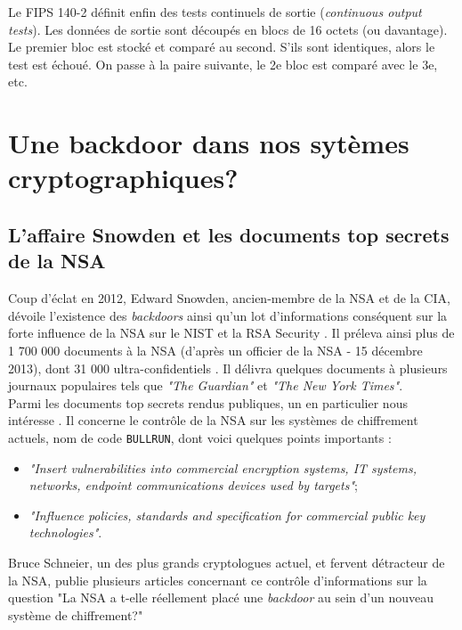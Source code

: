 		
		Le FIPS 140-2 définit enfin des tests continuels de sortie (\textit{continuous output tests}). Les données de sortie sont découpés en blocs de 16 octets (ou davantage). Le premier bloc est stocké et comparé au second. S'ils sont identiques, alors le test est échoué. On passe à la paire suivante, le 2e bloc est comparé avec le 3e, etc.

\section{Une backdoor dans nos sytèmes cryptographiques?}

	\subsection{L'affaire Snowden et les documents top secrets de la NSA}
	
	Coup d'éclat en 2012, Edward Snowden, ancien-membre de la NSA et de la CIA,	dévoile l'existence des \textit{backdoors} ainsi qu'un lot d'informations conséquent sur la forte influence de la NSA sur le NIST et la RSA Security \cite{snowden2013reuters}. Il préleva ainsi plus de 1 700 000 documents à la NSA (d'après un officier de la NSA - 15 décembre 2013), dont 31 000 ultra-confidentiels \cite{wikiSnowden}.	Il délivra quelques documents à plusieurs journaux populaires tels que \textit{"The Guardian"} et \textit{"The New York Times"}.\\
	
	
	Parmi les documents top secrets rendus publiques, un en particulier nous intéresse \cite{topsecretNSA}. Il concerne le contrôle de la NSA sur les systèmes de chiffrement actuels, nom de code \texttt{BULLRUN}, dont voici quelques points importants :\\ 
	\begin{itemize}
		\item \textit{"Insert vulnerabilities into commercial encryption systems, IT systems, networks, endpoint communications devices used by targets"};
		\item \textit{"Influence policies, standards and specification for commercial public key technologies"}.\\
	\end{itemize}
	
	Bruce Schneier, un des plus grands cryptologues actuel, et fervent détracteur de la NSA, publie plusieurs articles concernant ce contrôle d'informations sur la question "La NSA a t-elle réellement placé une \textit{backdoor} au sein d'un nouveau système de chiffrement?" \cite{schneier2007NSA} \\


